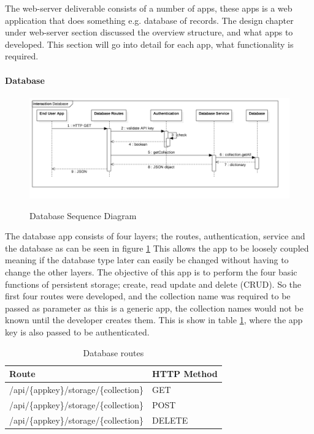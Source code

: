 

The web-server deliverable consists of a number of apps, these apps is a web application that does something e.g. database of records. The design chapter under web-server section discussed the overview structure, and what apps to developed. This section will go into detail for each app, what functionality is required.

\paragraph{Database}

\begin{figure}[!h]
    \caption{Database Sequence Diagram}
    \centering
    \includegraphics[width=150mm]{images/sequence/Database}
    \label{fig:database-seq}
\end{figure} 

The database app consists of four layers; the routes, authentication, service and the database as can be seen in figure \ref{fig:database-seq} This allows the app to be loosely coupled meaning if the database type later can easily be changed without having to change the other layers. The objective of this app is to perform the four basic functions of persistent storage; create, read update and delete (CRUD). So the first four routes were developed, and the collection name was required to be passed as parameter as this is a generic app, the collection names would not be known until the developer creates them. This is show in table \ref{tb:db-routes}, where the app key is also passed to be authenticated. 

\begin{table}[!h]
\centering
\caption{Database routes}
\label{tb:db-routes}
\begin{tabular}{|l|l|}
\hline
\rowcolor{green!20}
Route                                  & HTTP Method \\ \hline
/api/\{appkey\}/storage/\{collection\} & GET         \\ \hline
/api/\{appkey\}/storage/\{collection\} & POST        \\ \hline
/api/\{appkey\}/storage/\{collection\} & DELETE      \\ \hline
\end{tabular}
\end{table}

